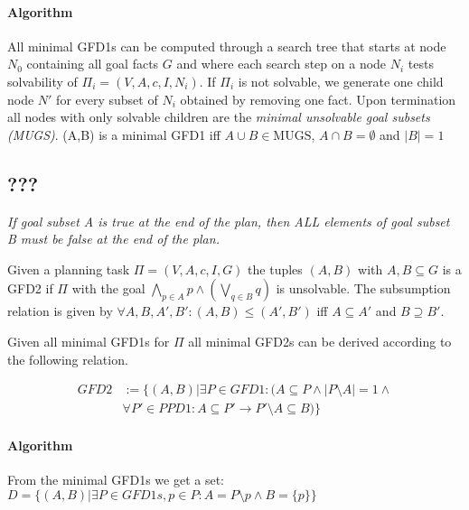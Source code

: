 \paragraph{Algorithm}
All minimal GFD1s can be computed through a search tree that starts at node $N_0$ containing
all goal facts $G$ and where each search step on a node $N_i$ tests solvability of 
$\Pi_i = (V,A,c,I,N_i)$. If $\Pi_i$ is not solvable, we generate one child 
node $N'$ for every subset of $N_i$ obtained by removing one fact.  
Upon termination all nodes with only solvable children are the \emph{minimal unsolvable 
goal subsets (MUGS)}. (A,B) is a minimal GFD1 iff $A \cup B \in \text{MUGS}$, 
$A \cap B = \emptyset$ and $|B| = 1$



\subsection{???}

\textit{If goal subset A is true at the end of the plan, 
then ALL elements of goal subset B must be false at the end of the plan.}\\

\begin{definition}
	Given a planning task $\Pi = (V,A,c,I,G)$ the tuples
	$(A,B)$ with $A,B \subseteq G $ is a GFD2 if 
	$\Pi$ with the goal $\bigwedge_{p \in A} p \wedge (\bigvee_{q \in B} q)$
	is unsolvable. 
	The subsumption relation is given by $\forall A,B,A',B': (A,B) \leq (A',B')$ iff $A \subseteq A'$
	and $B \supseteq B'$.
\end{definition}	

	\noindent
	Given all minimal GFD1s for $\Pi$ all minimal GFD2s can be derived according 
	to the following relation.


	\vspace{-0.3cm}
	\begin{align*}
		GFD2 &:= \{(A,B) | 
				\exists P \in GFD1:(
				   A \subseteq P \wedge |P \setminus A | = 1 \wedge\\
				   &\forall P' \in PPD1:
					  A \subseteq P' \rightarrow P' \setminus A \subseteq B
				)
			 \}
	\end{align*}

\paragraph{Algorithm}
From the minimal GFD1s we get a set:
	$D = \{(A,B) | \exists P \in GFD1s, p \in P: A = P \setminus p \wedge
	B = \{p\}\}$


